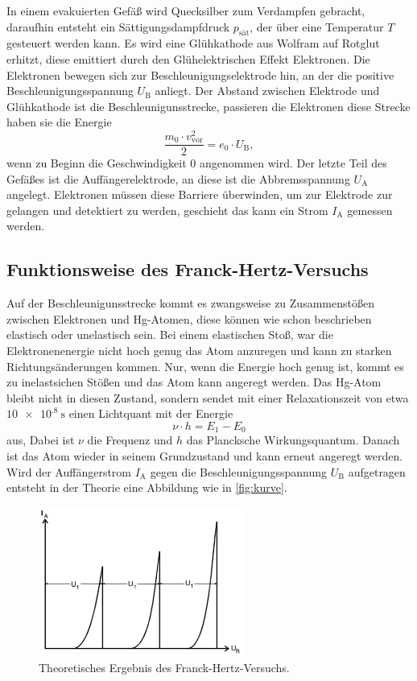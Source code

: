 In einem evakuierten Gefäß wird Quecksilber zum Verdampfen gebracht, daraufhin entsteht ein Sättigungsdampfdruck $p_\text{sät}$, der über eine Temperatur $T$ gesteuert werden kann.
Es wird eine Glühkathode aus Wolfram auf Rotglut erhitzt, diese emittiert durch den Glühelektrischen Effekt Elektronen.
Die Elektronen bewegen sich zur Beschleunigungselektrode hin, an der die positive Beschleunigungsspannung $U_\text{B}$ anliegt. 
Der Abstand zwischen Elektrode und Glühkathode ist die Beschleunigunsstrecke, passieren die Elektronen diese Strecke haben sie die Energie
\begin{equation}
    \frac{m_0 \cdot v^2_\text{vor}}{2} = e_0 \cdot U_\text{B},
    \label{eq:beschleu}
\end{equation}
wenn zu Beginn die Geschwindigkeit 0 angenommen wird.
Der letzte Teil des Gefäßes ist die Auffängerelektrode, an diese ist die Abbremsspannung $U_\text{A}$ angelegt.
Elektronen müssen diese Barriere überwinden, um zur Elektrode zur gelangen und detektiert zu werden, geschieht das kann ein Strom $I_\text{A}$ gemessen werden.

\subsection{Funktionsweise des Franck-Hertz-Versuchs}
\label{ssec:funktion}

Auf der Beschleunigunsstrecke kommt es zwangsweise zu Zusammenstößen zwischen Elektronen und Hg-Atomen, diese können wie schon beschrieben elastisch oder unelastisch sein.
Bei einem elastischen Stoß, war die Elektronenenergie nicht hoch genug das Atom anzuregen und kann zu starken Richtungsänderungen kommen.
Nur, wenn die Energie hoch genug ist, kommt es zu inelastsichen Stößen und das Atom kann angeregt werden.
Das Hg-Atom bleibt nicht in diesen Zustand, sondern sendet mit einer Relaxationszeit von etwa $\SI{10e.8}{\second}$ einen Lichtquant mit der Energie
\begin{equation}
    \nu \cdot h = E_1 - E_0
    \label{eq:quant}
\end{equation}
aus, Dabei ist $\nu$ die Frequenz und $h$ das Plancksche Wirkungsquantum.
Danach ist das Atom wieder in seinem Grundzustand und kann erneut angeregt werden.
Wird der Auffängerstrom $I_\text{A}$ gegen die Beschleunigungsspannung $U_\text{B}$ aufgetragen entsteht in der Theorie eine Abbildung wie in \autoref{fig:kurve}.

\begin{figure}
    \centering
    \includegraphics[width=0.6\textwidth]{images/bild2.png}
    \caption{Theoretisches Ergebnis des Franck-Hertz-Versuchs.\cite{V601}}
    \label{fig:kurve}
\end{figure}

